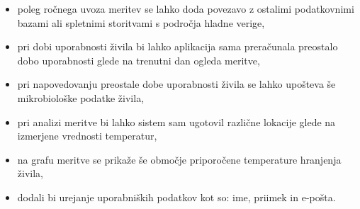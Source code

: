 \documentclass[a4paper, 12pt]{book}
\begin{document}
\begin{itemize}
	\item poleg ročnega uvoza meritev se lahko doda povezavo z ostalimi podatkovnimi bazami ali spletnimi storitvami s področja hladne verige,

	\item pri dobi uporabnosti živila bi lahko aplikacija sama preračunala preostalo dobo uporabnosti glede na trenutni dan ogleda meritve,

	\item pri napovedovanju preostale dobe uporabnosti živila se lahko upošteva še mikrobiološke podatke živila,

	\item pri analizi meritve bi lahko sistem sam ugotovil različne lokacije glede na izmerjene vrednosti temperatur,

	\item na grafu meritve se prikaže še območje priporočene temperature hranjenja živila,

	\item dodali bi urejanje uporabniških podatkov kot so: ime, priimek in e-pošta.
\end{itemize}



\ \\
\clearpage
{}


\end{document}
